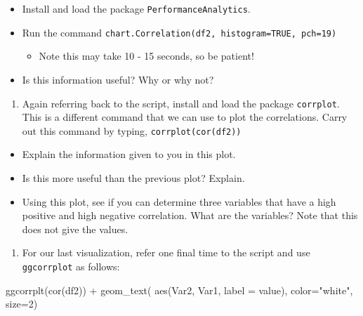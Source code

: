 \documentclass[
  letterpaper,
  DIV=11,
  numbers=noendperiod]{scrreprt}
\newenvironment{Shaded}{\begin{snugshade}}{\end{snugshade}}
\newcommand{\AttributeTok}[1]{\textcolor[rgb]{0.40,0.45,0.13}{#1}}
\newcommand{\DecValTok}[1]{\textcolor[rgb]{0.68,0.00,0.00}{#1}}
\newcommand{\FunctionTok}[1]{\textcolor[rgb]{0.28,0.35,0.67}{#1}}
\newcommand{\NormalTok}[1]{\textcolor[rgb]{0.00,0.23,0.31}{#1}}
\newcommand{\SpecialCharTok}[1]{\textcolor[rgb]{0.37,0.37,0.37}{#1}}
\newcommand{\StringTok}[1]{\textcolor[rgb]{0.13,0.47,0.30}{#1}}
\providecommand{\tightlist}{%
  \setlength{\itemsep}{0pt}\setlength{\parskip}{0pt}}\usepackage{longtable,booktabs,array}
\begin{document}
\begin{itemize}
\tightlist
\item
  Install and load the package \texttt{PerformanceAnalytics}.
\item
  Run the command
  \texttt{chart.Correlation(df2,\ histogram=TRUE,\ pch=19)}

  \begin{itemize}
  \tightlist
  \item
    Note this may take 10 - 15 seconds, so be patient!
  \end{itemize}
\item
  Is this information useful? Why or why not?
\end{itemize}

\begin{enumerate}
\def\labelenumi{\arabic{enumi}.}
\setcounter{enumi}{8}
\tightlist
\item
  Again referring back to the script, install and load the package
  \texttt{corrplot}. This is a different command that we can use to plot
  the correlations. Carry out this command by typing,
  \texttt{corrplot(cor(df2))}
\end{enumerate}

\begin{itemize}
\tightlist
\item
  Explain the information given to you in this plot.
\item
  Is this more useful than the previous plot? Explain.
\item
  Using this plot, see if you can determine three variables that have a
  high positive and high negative correlation. What are the variables?
  Note that this does not give the values.
\end{itemize}

\begin{enumerate}
\def\labelenumi{\arabic{enumi}.}
\setcounter{enumi}{9}
\tightlist
\item
  For our last visualization, refer one final time to the script and use
  \texttt{ggcorrplot} as follows:
\end{enumerate}

\begin{Shaded}
\begin{Highlighting}[]

\FunctionTok{ggcorrplt}\NormalTok{(}\FunctionTok{cor}\NormalTok{(df2)) }\SpecialCharTok{+}
  \FunctionTok{geom\_text}\NormalTok{( }\FunctionTok{aes}\NormalTok{(Var2, Var1, }\AttributeTok{label =}\NormalTok{ value), }\AttributeTok{color=}\StringTok{"white"}\NormalTok{, }\AttributeTok{size=}\DecValTok{2}\NormalTok{)}
  
\end{Highlighting}
\end{Shaded}
\end{document}
